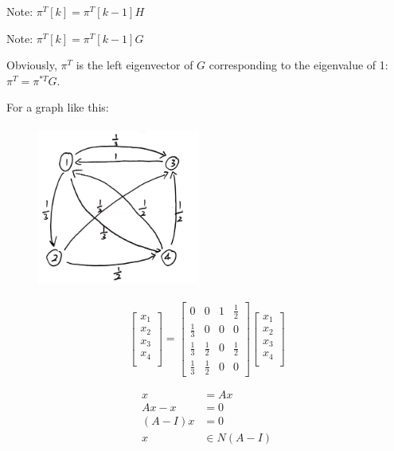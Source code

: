 Note: $\pi^T[k] = \pi^T[k - 1]H$



Note: $\pi^T[k] = \pi^T[k - 1]G$

Obviously, $\pi^{T}$ is the left eigenvector of $G$ corresponding to the eigenvalue of 1: $\pi^{T} = \pi^{*T}G$.

For a graph like this:


\begin{figure}
	\centering
	\includegraphics[width=2.1in,height=2.1in]{figures/ch03/figure3.jpg}
\end{figure}


$$
\left[
\begin{matrix}
x_1 \\
x_2 \\
x_3\\
x_4\\
\end{matrix}
\right] =
\left[
\begin{matrix}
0 & 0 & 1 & \frac{1}{2} \\
\frac{1}{3} & 0 & 0& 0 \\
\frac{1}{3}& \frac{1}{2} & 0 & \frac{1}{2} \\
\frac{1}{3} & \frac{1}{2} & 0 & 0 
\end{matrix}
\right]
\left[
\begin{matrix}
x_1 \\
x_2 \\
x_3\\
x_4\\
\end{matrix}
\right]
$$

\begin{align*}
x &= Ax \\
Ax - x &= 0\\
(A - I)x &= 0\\
x&\in N(A-I)
\end{align*}


